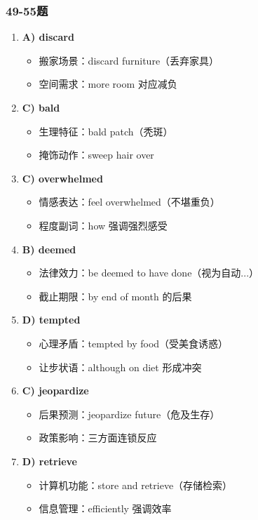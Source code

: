 \documentclass{article}
\begin{document}
\subsubsection*{49-55题}
\begin{enumerate}[resume*]
    \item \textbf{A) discard} 
    \begin{itemize}
        \item 搬家场景：discard furniture（丢弃家具）
        \item 空间需求：more room 对应减负
    \end{itemize}
    
    \item \textbf{C) bald} 
    \begin{itemize}
        \item 生理特征：bald patch（秃斑）
        \item 掩饰动作：sweep hair over
    \end{itemize}
    
    \item \textbf{C) overwhelmed} 
    \begin{itemize}
        \item 情感表达：feel overwhelmed（不堪重负）
        \item 程度副词：how 强调强烈感受
    \end{itemize}
    
    \item \textbf{B) deemed} 
    \begin{itemize}
        \item 法律效力：be deemed to have done（视为自动...）
        \item 截止期限：by end of month 的后果
    \end{itemize}
    
    \item \textbf{D) tempted} 
    \begin{itemize}
        \item 心理矛盾：tempted by food（受美食诱惑）
        \item 让步状语：although on diet 形成冲突
    \end{itemize}
    
    \item \textbf{C) jeopardize} 
    \begin{itemize}
        \item 后果预测：jeopardize future（危及生存）
        \item 政策影响：三方面连锁反应
    \end{itemize}
    
    \item \textbf{D) retrieve} 
    \begin{itemize}
        \item 计算机功能：store and retrieve（存储检索）
        \item 信息管理：efficiently 强调效率
    \end{itemize}
\end{enumerate}
\end{document}

